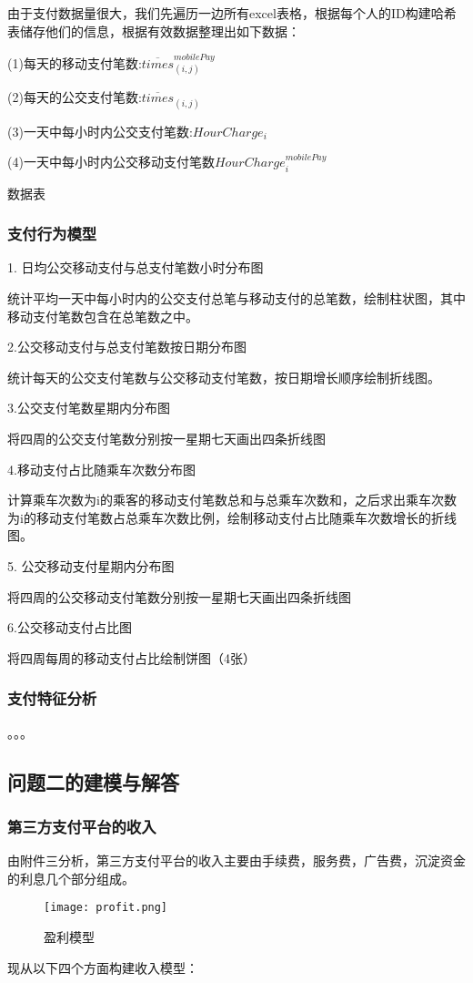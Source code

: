 \documentclass[withoutpreface,bwprint]{cumcmthesis} %
\begin{document}
由于支付数据量很大，我们先遍历一边所有excel表格，根据每个人的ID构建哈希表储存他们的信息，根据有效数据整理出如下数据：

(1)每天的移动支付笔数:$\overline {times}^{mobilePay}_{(i,j)}​$

(2)每天的公交支付笔数:$\overline {times}_{(i,j)}$

(3)一天中每小时内公交支付笔数:$HourCharge_{i}$

(4)一天中每小时内公交移动支付笔数$HourCharge_{i}^{mobilePay}$

数据表

\subsubsection{支付行为模型}

1. 日均公交移动支付与总支付笔数小时分布图

统计平均一天中每小时内的公交支付总笔与移动支付的总笔数，绘制柱状图，其中移动支付笔数包含在总笔数之中。

2.公交移动支付与总支付笔数按日期分布图

统计每天的公交支付笔数与公交移动支付笔数，按日期增长顺序绘制折线图。

3.公交支付笔数星期内分布图

将四周的公交支付笔数分别按一星期七天画出四条折线图

4.移动支付占比随乘车次数分布图

计算乘车次数为i的乘客的移动支付笔数总和与总乘车次数和，之后求出乘车次数为i的移动支付笔数占总乘车次数比例，绘制移动支付占比随乘车次数增长的折线图。

5. 公交移动支付星期内分布图

将四周的公交移动支付笔数分别按一星期七天画出四条折线图

6.公交移动支付占比图

将四周每周的移动支付占比绘制饼图（4张）

\subsubsection{支付特征分析}

。。。

\subsection{问题二的建模与解答}
\subsubsection{第三方支付平台的收入}
由附件三分析，第三方支付平台的收入主要由手续费，服务费，广告费，沉淀资金的利息几个部分组成。
\begin{figure}[htbp]
\centering
\texttt{[image: profit.png]}
\caption{盈利模型}
\end{figure}
现从以下四个方面构建收入模型：
\end{document}
